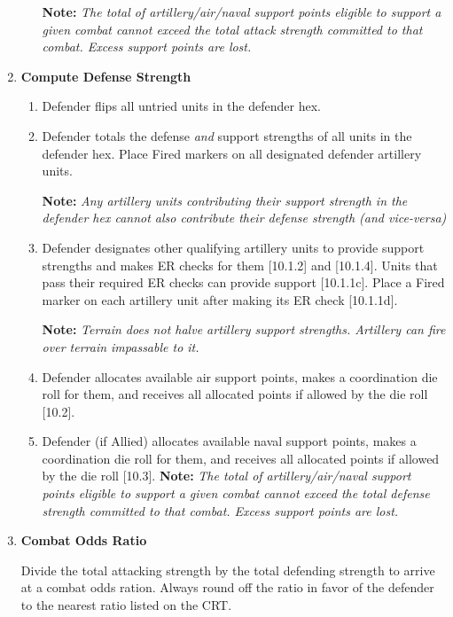 \begin{enumerate}[label=\textbf{\Roman*.}]
\begin{enumerate}[label=\alph*.]
        \textbf{Note:} \textit{The total of artillery/air/naval support points eligible to support a given combat cannot exceed the total attack strength committed to that combat. Excess support points are lost.}
    \end{enumerate}
    \item \textbf{Compute Defense Strength}
    \begin{enumerate}[label=\alph*.]
        \item Defender flips all untried units in the defender hex.
        \item Defender totals the defense \textit{and} support strengths of all units in the defender hex. Place Fired markers on all designated defender artillery units.
        
        \textbf{Note:} \textit{Any artillery units contributing their support strength in the defender hex cannot also contribute their defense strength (and vice-versa)}
        \item Defender designates other qualifying artillery units to provide support strengths and makes ER checks for them [10.1.2] and [10.1.4]. Units that pass their required ER checks can provide support [10.1.1c]. Place a Fired marker on each artillery unit after making its ER check [10.1.1d].
        
        \textbf{Note:} \textit{Terrain does not halve artillery support strengths. Artillery can fire over terrain impassable to it.}
        \item Defender allocates available air support points, makes a coordination die roll for them, and receives all allocated points if allowed by the die roll [10.2].
        \item Defender (if Allied) allocates available naval support points, makes a coordination die roll for them, and receives all allocated points if allowed by the die roll [10.3].
        \textbf{Note:} \textit{The total of artillery/air/naval support points eligible to support a given combat cannot exceed the total defense strength committed to that combat. Excess support points are lost.}
    \end{enumerate}
    \item \textbf{Combat Odds Ratio}
    \par
    Divide the total attacking strength by the total defending strength to arrive at a combat odds ration. Always round off the ratio in favor of the defender to the nearest ratio listed on the CRT.
    

\end{enumerate}
